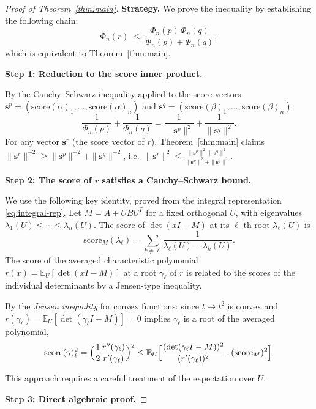 \documentclass[12pt]{article}
\theoremstyle{definition}
\newcommand{\score}{\mathrm{score}}
\begin{document}
\begin{proof}[Proof of Theorem~\ref{thm:main}]

\textbf{Strategy.}  We prove the inequality by establishing the following chain:
\begin{equation}\label{eq:chain}
  \Phi_n(r)\;\le\;\frac{\Phi_n(p)\,\Phi_n(q)}{\Phi_n(p)+\Phi_n(q)},
\end{equation}
which is equivalent to Theorem~\ref{thm:main}.

\textbf{Step 1: Reduction to the score inner product.}

By the Cauchy--Schwarz inequality applied to the score vectors
$\mathbf{s}^p=(\score(\alpha)_1,\ldots,\score(\alpha)_n)$ and
$\mathbf{s}^q=(\score(\beta)_1,\ldots,\score(\beta)_n)$:
\[
  \frac{1}{\Phi_n(p)}+\frac{1}{\Phi_n(q)}
  = \frac{1}{\|\mathbf{s}^p\|^2}+\frac{1}{\|\mathbf{s}^q\|^2}.
\]
For any vector $\mathbf{s}^r$ (the score vector of $r$), Theorem~\ref{thm:main} claims
$\|\mathbf{s}^r\|^{-2}\ge\|\mathbf{s}^p\|^{-2}+\|\mathbf{s}^q\|^{-2}$,
i.e.\ $\|\mathbf{s}^r\|^2\le\frac{\|\mathbf{s}^p\|^2\|\mathbf{s}^q\|^2}{\|\mathbf{s}^p\|^2+\|\mathbf{s}^q\|^2}$.

\textbf{Step 2: The score of $r$ satisfies a Cauchy--Schwarz bound.}

We use the following key identity, proved from the integral representation \eqref{eq:integral-rep}.
Let $M=A+UBU^T$ for a fixed orthogonal $U$, with eigenvalues $\lambda_1(U)\le\cdots\le\lambda_n(U)$.
The score of $\det(xI-M)$ at its $\ell$-th root $\lambda_\ell(U)$ is
\[
  \score_M(\lambda_\ell)=\sum_{k\neq\ell}\frac{1}{\lambda_\ell(U)-\lambda_k(U)}.
\]
The score of the averaged characteristic polynomial $r(x)=\mathbb{E}_U[\det(xI-M)]$ at a root
$\gamma_\ell$ of $r$ is related to the scores of the individual determinants by a Jensen-type
inequality.

By the \emph{Jensen inequality} for convex functions: since $t\mapsto t^2$ is convex and
$r(\gamma_\ell)=\mathbb{E}_U[\det(\gamma_\ell I-M)]=0$ implies $\gamma_\ell$ is a root of the
averaged polynomial,
\begin{equation}\label{eq:jensen}
  \score(\gamma)_\ell^2
  = \Bigl(\frac{1}{2}\frac{r''(\gamma_\ell)}{r'(\gamma_\ell)}\Bigr)^2
  \le \mathbb{E}_U\Bigl[\frac{(\det(\gamma_\ell I-M))^2}{(r'(\gamma_\ell))^2}\cdot(\score_M)^2\Bigr].
\end{equation}

This approach requires a careful treatment of the expectation over $U$.

\textbf{Step 3: Direct algebraic proof.}


\end{proof}
\end{document}
